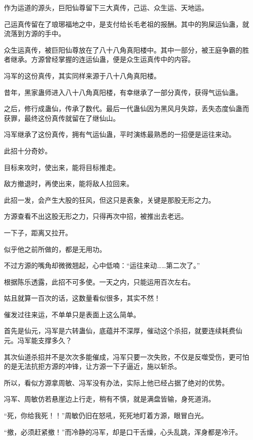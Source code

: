 \begin{this_body}
作为运道的源头，巨阳仙尊留下三大真传，己运、众生运、天地运。

己运真传留在了琅琊福地之中，是支付给长毛老祖的报酬。其中的狗屎运仙蛊，就流落到方源的手中。

众生运真传，被巨阳仙尊放在了八十八角真阳楼中。其中一部分，被王庭争霸的胜者继承。方源曾经掌握的连运仙蛊，便是众生运真传中的内容。

冯军的这份真传，其实同样来源于八十八角真阳楼。

昔年，黑家蛊师进入八十八角真阳楼，有幸继承了一部分真传，获得气运仙蛊。

之后，修行成蛊仙，传承了数代。最后一代蛊仙因为黑风月失踪，丢失态度仙蛊而获罪，最终这份真传就留在了继仙山。

冯军继承了这份真传，拥有气运仙蛊，平时演练最熟悉的一招便是运往来动。

此招十分奇妙。

目标来攻时，使出来，能将目标推走。

敌方撤退时，再使出来，能将敌人拉回来。

此招一发，会产生大股的狂风，但这只是表象，关键是那股无形之力。

方源查看不出这股无形之力，只得再次中招，被推出去老远。

一下子，距离又拉开。

似乎他之前所做的，都是无用功。

不过方源的嘴角却微微翘起，心中低喃：“运往来动……第二次了。”

根据陈乐透露，此招不可多使。一天之内，只能运用百次左右。

姑且就算一百次的话，这数量看似很多，其实不然！

催发过往来运，不单单只是表面上这么简单。

首先是仙元，冯军是六转蛊仙，底蕴并不深厚，催动这个杀招，就要连续耗费仙元。冯军能支撑多久？

其次仙道杀招并不是次次多能催成，冯军只要一次失败，不仅是反噬受伤，更可怕的是无法抗拒方源的冲锋，让方源一下子逼近，施以斩杀。

所以，看似方源拿周敏、冯军没有办法，实际上他已经占据了绝对的优势。

冯军、周敏仿若悬崖边上行走，稍有不慎，就是满盘皆输，身死道消。

“死，你给我死！！”周敏仍旧在怒吼，死死地盯着方源，眼冒白光。

“撤，必须赶紧撤！”而冷静的冯军，却是口干舌燥，心头乱跳，浑身都是冷汗。

\end{this_body}


